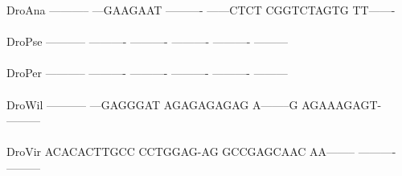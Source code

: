 \documentclass[11pt,twoside,reqno,a4paper]{article}
\begin{document}
{DroAna	-----------	---GAAGAAT	----------	------CTCT	CGGTCTAGTG	TT-------\\
\hspace*{7\charwidth}\hspace*{1\charwidth}\hspace*{1\charwidth}\hspace*{1\charwidth}\hspace*{1\charwidth}\hspace*{1\charwidth}\\
DroPse	-----------	----------	----------	----------	----------	---------\\
\hspace*{7\charwidth}\hspace*{1\charwidth}\hspace*{1\charwidth}\hspace*{1\charwidth}\hspace*{1\charwidth}\hspace*{1\charwidth}\\
DroPer	-----------	----------	----------	----------	----------	---------\\
\hspace*{7\charwidth}\hspace*{1\charwidth}\hspace*{1\charwidth}\hspace*{1\charwidth}\hspace*{1\charwidth}\hspace*{1\charwidth}\\
DroWil	-----------	---GAGGGAT	AGAGAGAGAG	A--------G	AGAAAGAGT-	---------\\
\hspace*{7\charwidth}\hspace*{1\charwidth}\hspace*{1\charwidth}\hspace*{1\charwidth}\hspace*{1\charwidth}\hspace*{1\charwidth}\\
DroVir	ACACACTTGCC	CCTGGAG-AG	GCCGAGCAAC	AA--------	----------	---------\\
\hspace*{7\charwidth}\hspace*{1\charwidth}\hspace*{1\charwidth}\hspace*{1\charwidth}\hspace*{1\charwidth}\hspace*{1\charwidth}\\
}
\end{document}
